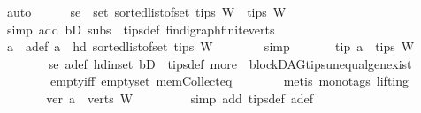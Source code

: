 \begin{isabellebody}
\ auto\isanewline
\ \ \ \ \isamarkupfalse%
\ se{\isacharcolon}{\kern0pt}\ {\isachardoublequoteopen}\ set\ {\isacharparenleft}{\kern0pt}sorted{\isacharunderscore}{\kern0pt}list{\isacharunderscore}{\kern0pt}of{\isacharunderscore}{\kern0pt}set\ {\isacharparenleft}{\kern0pt}tips\ W{\isacharparenright}{\kern0pt}{\isacharparenright}{\kern0pt}\ {\isacharequal}{\kern0pt}\ tips\ W{\isachardoublequoteclose}\ \ \isanewline
\ \ \ \ \ \ \isamarkupfalse%
\ {\isacharparenleft}{\kern0pt}simp\ add{\isacharcolon}{\kern0pt}\ bD\ subs\ \ tips{\isacharunderscore}{\kern0pt}def\ fin{\isacharunderscore}{\kern0pt}digraph{\isachardot}{\kern0pt}finite{\isacharunderscore}{\kern0pt}verts{\isacharparenright}{\kern0pt}\isanewline
\ \ \ \ \isamarkupfalse%
\ a\ \ a{\isacharunderscore}{\kern0pt}def{\isacharcolon}{\kern0pt}\ {\isachardoublequoteopen}a\ {\isacharequal}{\kern0pt}\ hd\ {\isacharparenleft}{\kern0pt}sorted{\isacharunderscore}{\kern0pt}list{\isacharunderscore}{\kern0pt}of{\isacharunderscore}{\kern0pt}set\ {\isacharparenleft}{\kern0pt}tips\ W{\isacharparenright}{\kern0pt}{\isacharparenright}{\kern0pt}{\isachardoublequoteclose}\isanewline
\ \ \ \ \ \ \isamarkupfalse%
\ simp\ \isanewline
\ \ \ \ \isamarkupfalse%
\ tip{\isacharcolon}{\kern0pt}\ {\isachardoublequoteopen}a\ {\isasymin}\ tips\ W{\isachardoublequoteclose}\ \ \isanewline
\ \ \ \ \ \ \isamarkupfalse%
\ se\ a{\isacharunderscore}{\kern0pt}def\ hd{\isacharunderscore}{\kern0pt}in{\isacharunderscore}{\kern0pt}set\ bD\ \ tips{\isacharunderscore}{\kern0pt}def\ more\ \ blockDAG{\isachardot}{\kern0pt}tips{\isacharunderscore}{\kern0pt}unequal{\isacharunderscore}{\kern0pt}gen{\isacharunderscore}{\kern0pt}exist\ \isanewline
\ \ \ \ \ \ \ \ empty{\isacharunderscore}{\kern0pt}iff\ empty{\isacharunderscore}{\kern0pt}set\ mem{\isacharunderscore}{\kern0pt}Collect{\isacharunderscore}{\kern0pt}eq\isanewline
\ \ \ \ \ \ \isamarkupfalse%
\ {\isacharparenleft}{\kern0pt}metis\ {\isacharparenleft}{\kern0pt}mono{\isacharunderscore}{\kern0pt}tags{\isacharcomma}{\kern0pt}\ lifting{\isacharparenright}{\kern0pt}{\isacharparenright}{\kern0pt}\ \ \ \ \isanewline
\ \ \ \ \isamarkupfalse%
\ \isamarkupfalse%
\ ver{\isacharcolon}{\kern0pt}\ {\isachardoublequoteopen}a\ {\isasymin}\ verts\ W{\isachardoublequoteclose}\ \isanewline
\ \ \ \ \ \ \isamarkupfalse%
\ {\isacharparenleft}{\kern0pt}simp\ add{\isacharcolon}{\kern0pt}\ tips{\isacharunderscore}{\kern0pt}def\ a{\isacharunderscore}{\kern0pt}def{\isacharparenright}{\kern0pt}\ \isanewline

\end{isabellebody}
